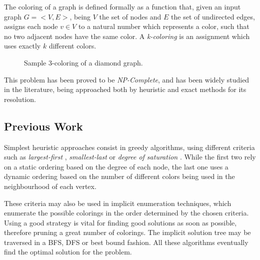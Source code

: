 The coloring of a graph is defined formally as a function that, given an input graph $G = <V,E>$, being $V$ the set of nodes and $E$ the set of undirected edges, assigns each node $v \in V$ to a natural number which represents a color, such that no two adjacent nodes have the same color. A \textit{k-coloring} is an assignment which uses exactly $k$ different colors.

\begin{figure}[h]
	\centering
\caption{Sample 3-coloring of a diamond graph.}
	\label{fig:samplecoloring}
\end{figure}

This problem has been proved to be \textit{NP-Complete}, and has been widely studied in the literature, being approached both by heuristic and exact methods for its resolution.

\subsection*{Previous Work}

Simplest heuristic approaches consist in greedy algorithms, using different criteria such as \textit{largest-first} \cite{welsh1967upper}, \textit{smallest-last} \cite{matula1972graph} or \textit{degree of saturation} \cite{brelaz1979new}. While the first two rely on a static ordering based on the degree of each node, the last one uses a dynamic ordering based on the number of different colors being used in the neighbourhood of each vertex.

These criteria may also be used in implicit enumeration techniques, which enumerate the possible colorings in the order determined by the chosen criteria. Using a good strategy is vital for finding good solutions as soon as possible, therefore pruning a great number of colorings. The implicit solution tree may be traversed in a BFS, DFS or best bound fashion. All these algorithms eventually find the optimal solution for the problem.

